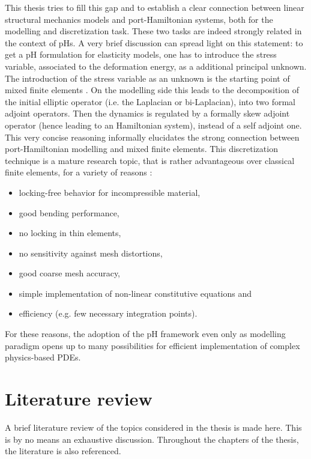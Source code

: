 This thesis tries to fill this gap and to establish a clear connection between linear structural mechanics models and port-Hamiltonian systems, both for the modelling and discretization task. These two tasks are indeed strongly related in the context of pHs. A very brief discussion can spread light on this statement: to get a pH formulation for elasticity models, one has to introduce the stress variable, associated to the deformation energy, as a additional principal unknown. The introduction of the stress variable as an unknown is the starting point of mixed finite elements \cite{arnold1990intro}. On the modelling side this leads to the decomposition of the initial elliptic operator (i.e. the Laplacian or bi-Laplacian), into two formal adjoint operators. Then the dynamics is regulated by a formally skew adjoint operator (hence leading to an Hamiltonian system), instead of a self adjoint one. This very concise reasoning informally elucidates the strong connection between port-Hamiltonian modelling and mixed finite elements. This discretization technique is a mature research topic, that is rather advantageous over classical finite elements, for a variety of reasons \cite{wriggers2009}:
\begin{itemize}
	\item locking-free behavior for incompressible material,
	\item good bending performance, 
	\item no locking in thin elements,
	\item no sensitivity against mesh distortions,
	\item good coarse mesh accuracy, 
	\item simple implementation of non-linear constitutive equations and
	\item efficiency (e.g. few necessary integration points).
\end{itemize}
For these reasons, the adoption of the pH framework even only as modelling paradigm opens up to many possibilities for efficient implementation of complex physics-based PDEs. 

 


\section{Literature review}
A brief literature review of the topics considered in the thesis is made here. This is by no means an exhaustive discussion. Throughout the chapters of the thesis, the literature is also referenced.



